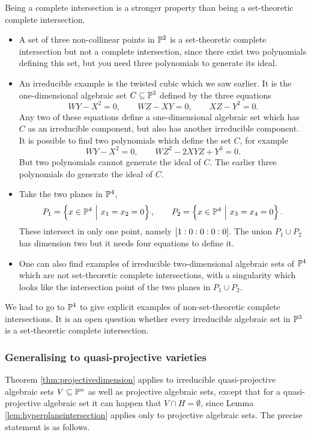 Being a complete intersection is a stronger property than being a set-theoretic complete intersection.

\begin{example*}
\hfill
\begin{itemize}
\item A set of three non-collinear points in $ \mathbb{P}^2 $ is a set-theoretic complete intersection but not a complete intersection, since there exist two polynomials defining this set, but you need three polynomials to generate its ideal.
\item An irreducible example is the twisted cubic which we saw earlier. It is the one-dimensional algebraic set $ C \subseteq \mathbb{P}^3 $ defined by the three equations
$$ WY - X^2 = 0, \qquad WZ - XY = 0, \qquad XZ - Y^2 = 0. $$
Any two of these equations define a one-dimensional algebraic set which has $ C $ as an irreducible component, but also has another irreducible component. It is possible to find two polynomials which define the set $ C $, for example
$$ WY - X^2 = 0, \qquad WZ^2 - 2XYZ + Y^3 = 0. $$
But two polynomials cannot generate the ideal of $ C $. The earlier three polynomials do generate the ideal of $ C $.
\item Take the two planes in $ \mathbb{P}^4 $,
$$ P_1 = \cbr{x \in \PP^4 \st x_1 = x_2 = 0}, \qquad P_2 = \cbr{x \in \PP^4 \st x_3 = x_4 = 0}. $$
These intersect in only one point, namely $ \sbr{1 : 0 : 0 : 0 : 0} $. The union $ P_1 \cup P_2 $ has dimension two but it needs four equations to define it.
\item One can also find examples of irreducible two-dimensional algebraic sets of $ \mathbb{P}^4 $ which are not set-theoretic complete intersections, with a singularity which looks like the intersection point of the two planes in $ P_1 \cup P_2 $.
\end{itemize}
\end{example*}

We had to go to $ \mathbb{P}^4 $ to give explicit examples of non-set-theoretic complete intersections. It is an open question whether every irreducible algebraic set in $ \mathbb{P}^3 $ is a set-theoretic complete intersection.

\subsubsection{Generalising to quasi-projective varieties}

Theorem \ref{thm:projectivedimension} applies to irreducible quasi-projective algebraic sets $ V \subseteq \mathbb{P}^n $ as well as projective algebraic sets, except that for a quasi-projective algebraic set it can happen that $ V \cap H = \emptyset $, since Lemma \ref{lem:hyperplaneintersection} applies only to projective algebraic sets. The precise statement is as follows.

